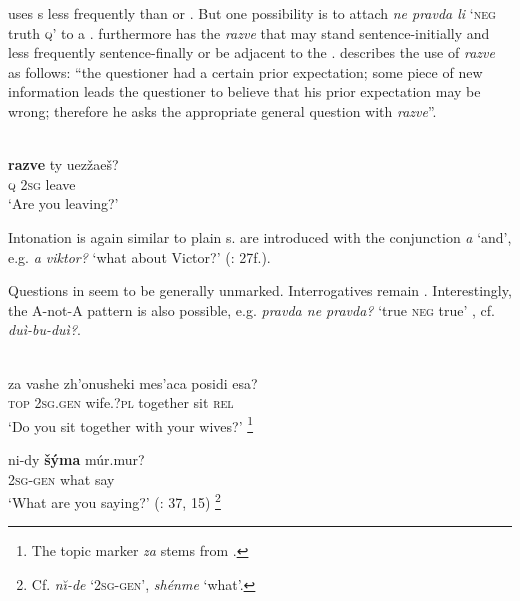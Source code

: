  uses s less frequently than  or . But one possibility is to attach \textit{ne pravda li} ‘\textsc{neg} truth \textsc{q}’ to a  \citep[32]{Comrie1984}.  furthermore has the  \textit{razve} that may stand sentence-initially and less frequently sentence-finally or be adjacent to the . \cite[21f.]{Comrie1984} describes the use of \textit{razve} as follows: “the questioner had a certain prior expectation; some piece of new information leads the questioner to believe that his prior expectation may be wrong; therefore he asks the appropriate general question with \textit{razve}”.

\newpage 
\ea%
    \label{ex:indo:23}
    \\
    \gll \textbf{{razve}} ty  uezžaeš?\\
    \textsc{q}  2\textsc{sg}  leave\\
    \glt ‘Are you leaving?’ \citep[22]{Comrie1984}
    \z

\noindent Intonation is again similar to plain s.  are introduced with the conjunction \textit{a} ‘and’, e.g. \textit{a viktor?} ‘what about Victor?’ (\citealt{Comrie1984}: 27f.).

Questions in \textit{} seem to be generally unmarked. Interrogatives remain . Interestingly, the  A-not-A pattern is also possible, e.g. \textit{pravda ne pravda?} ‘true \textsc{neg} true’ \citep[39]{Shapiro2010}, cf.  \textit{duì-bu-duì?}.

\ea%
    \label{ex:indo:24}
    \\
    \ea
    \gll za vashe    zh’onusheki  mes’aca  posidi  esa?\\
    \textsc{top}  2\textsc{sg.gen}  wife.?\textsc{pl}  together  sit  \textsc{rel}\\
    \glt ‘Do you sit together with your wives?’
    \footnote{The topic marker \textit{za} stems from  \citep[35]{Shapiro2010}.}

    \ex
    \gll ni-dy \textbf{{šýma}} múr.mur?\\
    2\textsc{sg-gen}  what  say\\
    \glt ‘What are you saying?’ (\citealt{Shapiro2010}: 37, 15)
    \footnote{Cf.  \textit{n\u{\i}-de}  ‘2\textsc{sg-gen}’, \textit{shénme}  ‘what’.}
    \z
    \z

